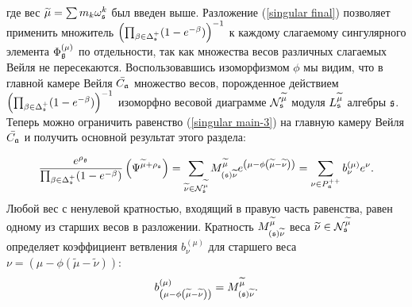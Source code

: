 где вес $\widetilde{\mu }=\sum m_{k}\omega _{\mathfrak{s}}^{k}$ был введен выше. Разложение (\ref{singular final}) позволяет применить множитель $\left( \prod_{\beta \in \Delta _{\mathfrak{s}}^{+}}(1-e^{-\beta })\right) ^{-1}$ к каждому слагаемому сингулярного элемента  $\Phi _{\mathfrak{g}}^{\left( \mu \right)}$ по отдельности, так как множества весов различных слагаемых Вейля не пересекаются. Воспользовавшись изоморфизмом  $\phi $ мы видим, что в главной камере Вейля  $\bar{C_{\mathfrak{a}}}$ множество весов, порожденное действием $\left( \prod_{\beta\in \Delta _{\mathfrak{s}}^{+}}(1-e^{-\beta })\right)^{-1}$ изоморфно весовой диаграмме  $\mathcal{N}_{\mathfrak{s}}^{\widetilde{\mu }}$  модуля  $L_{\mathfrak{s}}^{\widetilde{\mu }}$ алгебры $\mathfrak{s}$. Теперь можно ограничить равенство (\ref{singular main-3}) на главную камеру Вейля $\bar{C_{\mathfrak{a}}}$ и получить основной результат этого раздела:
\begin{Prop}
\begin{equation}
\frac{e^{\rho _{\gf}}}{\prod_{\beta \in \Delta _{\sfr%
}^{+}}(1-e^{-\beta })}\left( \Psi ^{\widetilde{\mu }+\rho _{\sfr%
}}\right) =\sum_{\widetilde{\nu }\in \mathcal{N}_{\sfr}^{\widetilde{\mu }%
}}M_{\left( \sfr\right) \widetilde{\nu }}^{\widetilde{\mu }}e^{\left(
\mu -\phi \left( \widetilde{\mu }-\widetilde{\nu }\right) \right)
}=\sum_{\nu \in P_{\af}^{++}}b_{\nu }^{(\mu )}e^{\nu }.
\label{singular main-4}
\end{equation}
Любой вес с ненулевой кратностью, входящий в правую часть равенства, равен одному из старших весов в разложении. Кратность $M_{\left( \mathfrak{s}
\right) \widetilde{\nu }}^{\widetilde{\mu }}$ веса  $\widetilde{\nu}\in \mathcal{N}_{\mathfrak{s}}^{\widetilde{\mu }}$ определяет коэффициент ветвления  $b_{\nu }^{(\mu )}$ для старшего веса $\nu =\left( \mu-\phi \left( \widetilde{\mu }-\widetilde{\nu }\right) \right) $:
\[
b_{\left( \mu -\phi \left( \widetilde{\mu }-\widetilde{\nu }\right) \right)
}^{(\mu )}=M_{\left( \mathfrak{s}\right) \widetilde{\nu }}^{\widetilde{\mu }}.
\]
\end{Prop}

